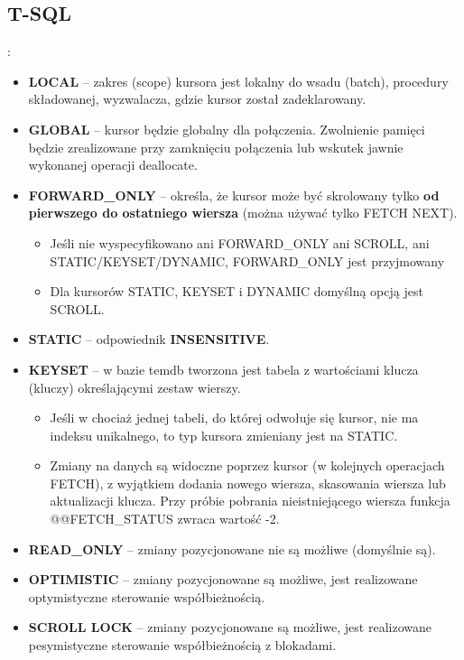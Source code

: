 \documentclass[a4paper]{article}
\begin{document}
    \subsection{T-SQL}:
    \begin{itemize}
        \item \textbf{LOCAL} – zakres (scope) kursora jest lokalny do wsadu (batch), procedury składowanej, wyzwalacza, gdzie kursor
        został zadeklarowany.
        \item \textbf{GLOBAL} – kursor będzie globalny dla
        połączenia. Zwolnienie pamięci będzie zrealizowane przy zamknięciu połączenia lub wskutek jawnie wykonanej operacji
        deallocate.
        \item \textbf{FORWARD\_ONLY} – określa, że kursor może być skrolowany tylko \textbf{od pierwszego do ostatniego wiersza} (można
        używać tylko FETCH NEXT).
        \begin{itemize}
            \item Jeśli nie wyspecyfikowano ani FORWARD\_ONLY ani SCROLL, ani STATIC/KEYSET/DYNAMIC, FORWARD\_ONLY jest przyjmowany
            \item Dla kursorów STATIC, KEYSET
            i DYNAMIC domyślną opcją jest SCROLL.
        \end{itemize}
        \item \textbf{STATIC} – odpowiednik \textbf{INSENSITIVE}.
        \item \textbf{KEYSET} – w bazie temdb tworzona jest tabela z wartościami klucza (kluczy) określającymi zestaw wierszy.
        \begin{itemize}
            \item Jeśli w chociaż jednej tabeli, do której odwołuje się kursor, nie ma indeksu unikalnego, to typ kursora zmieniany jest na
            STATIC.
            \item Zmiany na danych są widoczne poprzez kursor (w kolejnych operacjach FETCH), z wyjątkiem dodania nowego
            wiersza, skasowania wiersza lub aktualizacji klucza. Przy próbie pobrania nieistniejącego wiersza funkcja
            @@FETCH\_STATUS zwraca wartość -2.
        \end{itemize}
        \item \textbf{READ\_ONLY} – zmiany pozycjonowane nie są możliwe (domyślnie są).
        \item \textbf{OPTIMISTIC} – zmiany pozycjonowane są możliwe, jest realizowane optymistyczne sterowanie współbieżnością.
        \item \textbf{SCROLL LOCK} – zmiany pozycjonowane są możliwe, jest realizowane pesymistyczne sterowanie współbieżnością z blokadami.

\end{itemize}
\end{document}
